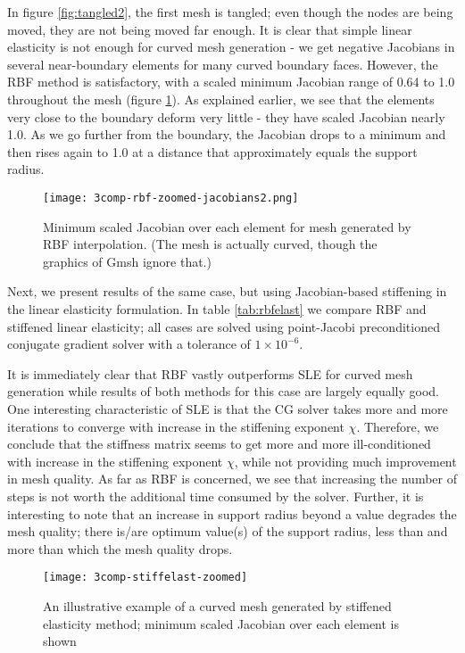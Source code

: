  In figure \ref{fig:tangled2}, the first mesh is tangled; even though the nodes are being moved, they are not being moved far enough. It is clear that simple linear elasticity is not enough for curved mesh generation - we get negative Jacobians in several near-boundary elements for many curved boundary faces. However, the RBF method is satisfactory, with a scaled minimum Jacobian range of 0.64 to 1.0 throughout the mesh (figure \ref{fig:rbf-jacobians}). As explained earlier, we see that the elements very close to the boundary deform very little - they have scaled Jacobian nearly 1.0. As we go further from the boundary, the Jacobian drops to a minimum and then rises again to 1.0 at a distance that approximately equals the support radius.
 
 \begin{figure}
 	\centering
 	\texttt{[image: 3comp-rbf-zoomed-jacobians2.png]}
 	\caption{Minimum scaled Jacobian over each element for mesh generated by RBF interpolation. (The mesh is actually curved, though the graphics of Gmsh ignore that.)}
 	\label{fig:rbf-jacobians}
 \end{figure}

Next, we present results of the same case, but using Jacobian-based stiffening in the linear elasticity formulation. In table \ref{tab:rbfelast} we compare RBF and stiffened linear elasticity; all cases are solved using point-Jacobi preconditioned conjugate gradient solver with a tolerance of $1\times 10^{-6}$.

It is immediately clear that RBF vastly outperforms SLE for curved mesh generation while results of both methods for this case are largely equally good. One interesting characteristic of SLE is that the CG solver takes more and more iterations to converge with increase in the stiffening exponent $\chi$. Therefore, we conclude that the stiffness matrix seems to get more and more ill-conditioned with increase in the stiffening exponent $\chi$, while not providing much improvement in mesh quality. As far as RBF is concerned, we see that increasing the number of steps is not worth the additional time consumed by the solver. Further, it is interesting to note that an increase in support radius beyond a value degrades the mesh quality; there is/are optimum value(s) of the support radius, less than and more than which the mesh quality drops.

\begin{figure}
 	\centering
 	\texttt{[image: 3comp-stiffelast-zoomed]}
 	\caption{An illustrative example of a curved mesh generated by stiffened elasticity method; minimum scaled Jacobian over each element is shown}
 	\label{fig:3compstiffelast}
\end{figure}


